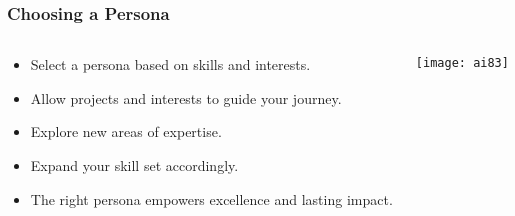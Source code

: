 \begin{frame}[fragile]\frametitle{Choosing a Persona}

\begin{columns}
    \begin{column}[T]{0.6\linewidth}
        \begin{itemize}
            \item Select a persona based on skills and interests.
            \item Allow projects and interests to guide your journey.
            \item Explore new areas of expertise.
            \item Expand your skill set accordingly.
            \item The right persona empowers excellence and lasting impact.
        \end{itemize}

    \end{column}
    \begin{column}[T]{0.4\linewidth}


			\begin{center}
			\texttt{[image: ai83]}
			\end{center}
			
    \end{column}
  \end{columns}
  
  
  

\end{frame}


